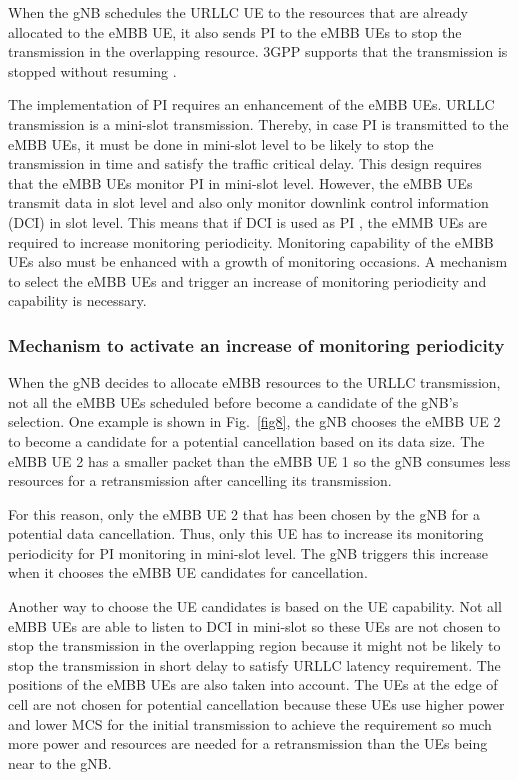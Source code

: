 \documentclass{ieeeaccess}
\begin{document}
When the gNB schedules the URLLC UE to the resources that are already allocated to the eMBB UE, it also sends PI to the eMBB UEs to stop the transmission in the overlapping resource. 3GPP supports that the transmission is stopped without resuming \cite{ref20}. 

The implementation of PI requires an enhancement of the eMBB UEs. URLLC transmission is a mini-slot transmission. Thereby, in case PI is transmitted to the eMBB UEs, it must be done in mini-slot level to be likely to stop the transmission in time and satisfy the traffic critical delay. This design requires that the eMBB UEs monitor PI in mini-slot level. However, the eMBB UEs transmit data in slot level and also only monitor downlink control information (DCI) in slot level. This means that if DCI is used as PI \cite{ref20}, the eMMB UEs are required to increase monitoring periodicity. Monitoring capability of the eMBB UEs also must be enhanced with a growth of monitoring occasions. A mechanism to select the eMBB UEs and trigger an increase of monitoring periodicity and capability is necessary. 

\subsubsection{Mechanism to activate an increase of monitoring periodicity}
When the gNB decides to allocate eMBB resources to the URLLC transmission, not all the eMBB UEs scheduled before become a candidate of the gNB's selection. One example is shown in Fig.~\ref{fig8}, the gNB chooses the eMBB UE 2 to become a candidate for a potential cancellation based on its data size. The eMBB UE 2 has a smaller packet than the eMBB UE 1 so the gNB consumes less resources for a retransmission after cancelling its transmission. 

For this reason, only the eMBB UE 2 that has been chosen by the gNB for a potential data cancellation. Thus, only this UE has to increase its monitoring periodicity for PI monitoring in mini-slot level. The gNB triggers this increase when it chooses the eMBB UE candidates for cancellation.

Another way to choose the UE candidates is based on the UE capability. Not all eMBB UEs are able to listen to DCI in mini-slot so these UEs are not chosen to stop the transmission in the overlapping region because it might not be likely to stop the transmission in short delay to satisfy URLLC latency requirement.
The positions of the eMBB UEs are also taken into account. The UEs at the edge of cell are not chosen for potential cancellation because these UEs use higher power and lower MCS for the initial transmission to achieve the requirement so much more power and resources are needed for a retransmission than the UEs being near to the gNB.
\end{document}

